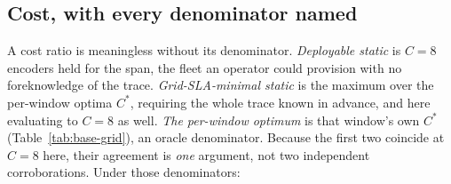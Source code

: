 \subsection{Cost, with every denominator named}
\label{sec:cl-ledger-cost}

A cost ratio is meaningless without its denominator. \emph{Deployable static}
is $C{=}8$ encoders held for the span, the fleet an operator could provision
with no foreknowledge of the trace. \emph{Grid-SLA-minimal static} is the
maximum over the per-window optima $C^{*}$, requiring the whole trace known in
advance, and here evaluating to $C{=}8$ as well. \emph{The per-window optimum}
is that window's own $C^{*}$ (Table~\ref{tab:base-grid}), an oracle
denominator. Because the first two coincide at $C{=}8$ here, their agreement is
\emph{one} argument, not two independent corroborations. Under those denominators:

